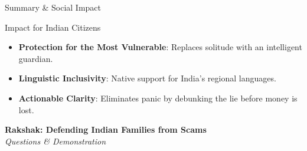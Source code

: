 \documentclass[aspectratio=169,10pt]{beamer}
\begin{document}
\begin{frame}{Summary \& Social Impact}
\begin{block}{Impact for Indian Citizens}
\begin{itemize}
    \item \textbf{Protection for the Most Vulnerable}: Replaces solitude with an intelligent guardian.
    \item \textbf{Linguistic Inclusivity}: Native support for India's regional languages.
    \item \textbf{Actionable Clarity}: Eliminates panic by debunking the lie before money is lost.
\end{itemize}
\end{block}

\vspace{0.4cm}
\begin{center}
\LARGE \textbf{Rakshak: Defending Indian Families from Scams} \\
\vspace{0.2cm}
\normalsize \textit{Questions \& Demonstration}
\end{center}
\end{frame}
\end{document}
